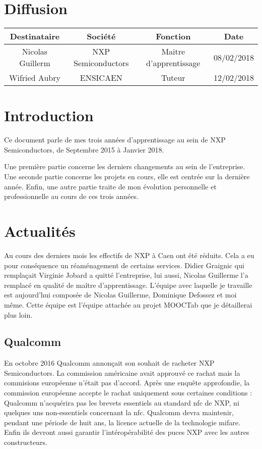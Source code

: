 \documentclass[french,12pt,a4paper,titlepage,openright,openbib]{report}
\begin{document}
{\let \clearpage \relax \chapter*{Diffusion}}
\begin{table}[ht]
	\label{tab:diffusion}
	\centering
	\begin{tabular}{|c|c|c|c|}
		\hline
		{\bf Destinataire} & {\bf Société}      & {\bf Fonction}   		 & {\bf Date}\\
		\hline
		Nicolas Guillerm   & NXP Semiconductors & Maitre d'apprentissage & 08/02/2018 \\
		\hline
		Wifried Aubry      & ENSICAEN 			& Tuteur				 & 12/02/2018 \\
		\hline
	\end{tabular}
\end{table}

\chapter{Introduction}

Ce document parle de mes trois années d'apprentissage au sein de NXP Semiconductors, de Septembre 2015 à Janvier 2018.

Une première partie concerne les derniers changements au sein de l'entreprise.
Une seconde partie concerne les projets en cours, elle est centrée sur la dernière année.
Enfin, une autre partie traite de mon évolution personnelle et professionnelle au cours de ces trois années.

\chapter{Actualités}

Au cours des derniers mois les effectifs de NXP à Caen ont été réduits. Cela a eu pour conséquence un réaménagement de certains services.
Didier Graignic qui remplaçait Virginie Jobard a quitté l'entreprise, lui aussi, Nicolas Guillerme l'a remplacé en qualité de maître d'apprentissage.
L'équipe avec laquelle je travaille est aujourd'hui composée de Nicolas Guillerme, Dominique Defossez et moi même. Cette équipe est l'équipe attachée au projet MOOCTab que je détaillerai plus loin.


\section{Qualcomm}

En octobre 2016 Qualcomm annonçait son souhait de racheter NXP Semiconductors. La commission américaine avait approuvé ce rachat mais la commisions européenne n'était pas d'accord. Après une enquête approfondie, la commission européenne accepte le rachat uniquement sous certaines conditions :
Qualcomm n'acquérira pas les brevets essentiels au standard \gls{nfc} de NXP, ni quelques uns non-essentiels concernant la \gls{nfc}.
Qualcomm devra maintenir, pendant une période de huit ans, la licence actuelle de la technologie \gls{mifare}. Enfin ils devront aussi garantir l'intéropérabilité des puces NXP avec les autres constructeurs.
\end{document}
